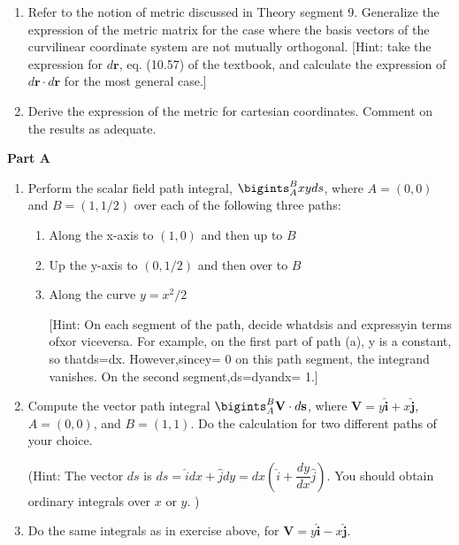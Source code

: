 \documentclass[fleqn]{article}
\begin{document}
\begin{enumerate}
    \item Refer to the notion of metric discussed in Theory segment 9.  Generalize the expression of the metric matrix for the case where the basis vectors of the curvilinear coordinate system are not mutually orthogonal.  [Hint: take the expression for  $d\mathbf{r}$, eq. (10.57) of the textbook, and calculate the expression of $d\mathbf{r} \cdot d\mathbf{r}$ for the most general case.]


    \item Derive the expression of the metric for cartesian coordinates. Comment on the results as adequate.
    
  \end{enumerate}


  \textbf{Part A}
  \begin{enumerate}
    \item  Perform the scalar field path integral, $\bigints_A^B xy ds$, where $A=(0,0)$ and $B=(1,1/2)$ over each of the following three paths:
      \begin{enumerate}
      \item Along the x-axis to $(1, 0)$ and then up to $B$
      \item Up the y-axis to $(0, 1/2)$ and then over to $B$

      \item Along the curve $y = x^2/2$ 

      [Hint:  On each segment of the path,  decide whatdsis and expressyin terms ofxor viceversa.  
      For example, on the first part of path (a), y is a constant, so thatds=dx.  
      However,sincey= 0 on this path segment, the integrand vanishes.  On the second segment,ds=dyandx= 1.]
      \end{enumerate}

    \item Compute the vector path integral $\bigints_A^B \mathbf{V}\cdot d\mathbf{s}$, where $\mathbf{V}=y \mathbf{\hat i} + x \mathbf{\hat j}$, $A=(0,0)$, and $B=(1,1)$. Do the calculation for two different paths of your choice.

    (Hint:  The vector $ds$ is $ds=\hat{i}dx+\hat{j}dy=dx(\hat{i}+\dfrac{dy}{dx} \hat{j})$.  
    You should obtain ordinary integrals over $x$ or $y$.  )

    \item Do the same integrals as in exercise above, for $\mathbf{V}=y \mathbf{\hat i} - x \mathbf{\hat j}$. 

  \end{enumerate}
\end{document}
